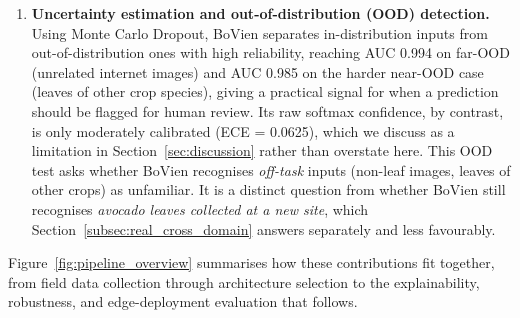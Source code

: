 \begin{enumerate}
    \item \textbf{Uncertainty estimation and out-of-distribution (OOD) detection.} Using Monte Carlo Dropout, BoVien separates in-distribution inputs from out-of-distribution ones with high reliability, reaching AUC 0.994 on far-OOD (unrelated internet images) and AUC 0.985 on the harder near-OOD case (leaves of other crop species), giving a practical signal for when a prediction should be flagged for human review. Its raw softmax confidence, by contrast, is only moderately calibrated (ECE = 0.0625), which we discuss as a limitation in Section~\ref{sec:discussion} rather than overstate here. This OOD test asks whether BoVien recognises \emph{off-task} inputs (non-leaf images, leaves of other crops) as unfamiliar. It is a distinct question from whether BoVien still recognises \emph{avocado leaves collected at a new site}, which Section~\ref{subsec:real_cross_domain} answers separately and less favourably.
\end{enumerate}

Figure~\ref{fig:pipeline_overview} summarises how these contributions fit together, from field data collection through architecture selection to the explainability, robustness, and edge-deployment evaluation that follows.

